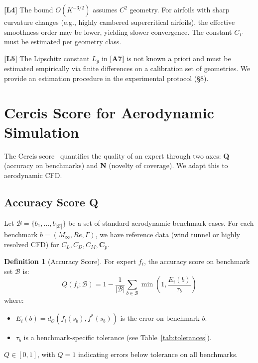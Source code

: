 \documentclass[11pt,a4paper]{article}
\theoremstyle{definition}
\newtheorem{definition}[theorem]{Definition}
\theoremstyle{remark}
\newcommand{\assumptionTag}[1]{\textsf{\textbf{[A#1]}}}
\newcommand{\limitationTag}[1]{\textsf{\textbf{[L#1]}}}
\begin{document}
\limitationTag{4} The bound $O(K^{-3/2})$ assumes $C^2$ geometry. For airfoils with sharp curvature changes (e.g., highly cambered supercritical airfoils), the effective smoothness order may be lower, yielding slower convergence. The constant $C_\Gamma$ must be estimated per geometry class.

\limitationTag{5} The Lipschitz constant $L_g$ in \assumptionTag{7} is not known a priori and must be estimated empirically via finite differences on a calibration set of geometries. We provide an estimation procedure in the experimental protocol (§8).

\section{Cercis Score for Aerodynamic Simulation}

The Cercis score~\citep{scx_theory} quantifies the quality of an expert through two axes: \textbf{Q} (accuracy on benchmarks) and \textbf{N} (novelty of coverage).
We adapt this to aerodynamic CFD.

\subsection{Accuracy Score Q}

Let $\mathcal{B} = \{b_1, \dots, b_{|\mathcal{B}|}\}$ be a set of standard aerodynamic benchmark cases.
For each benchmark $b = (M_\infty, Re, \Gamma)$, we have reference data (wind tunnel or highly resolved CFD) for $C_L, C_D, C_M, \mathbf{C}_p$.

\begin{definition}[Accuracy Score]
For expert $f_i$, the accuracy score on benchmark set $\mathcal{B}$ is:
\begin{equation}
Q(f_i; \mathcal{B}) = 1 - \frac{1}{|\mathcal{B}|} \sum_{b \in \mathcal{B}} \min\left(1, \frac{E_i(b)}{\tau_b}\right)
\label{eq:qscore}
\end{equation}
where:
\begin{itemize}[nosep]
    \item $E_i(b) = d_{\mathcal{O}}(f_i(s_b), f^*(s_b))$ is the error on benchmark $b$.
    \item $\tau_b$ is a benchmark-specific tolerance (see Table~\ref{tab:tolerances}).
\end{itemize}
$Q \in [0, 1]$, with $Q=1$ indicating errors below tolerance on all benchmarks.
\end{definition}
\end{document}
